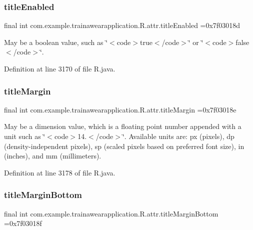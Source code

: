 \subsubsection{\texorpdfstring{titleEnabled}{titleEnabled}}
{\footnotesize\ttfamily final int com.\+example.\+trainawearapplication.\+R.\+attr.\+title\+Enabled =0x7f03018d\hspace{0.3cm}{\ttfamily [static]}}

May be a boolean value, such as \char`\"{}$<$code$>$true$<$/code$>$\char`\"{} or \char`\"{}$<$code$>$false$<$/code$>$\char`\"{}. 

Definition at line 3170 of file R.\+java.

\mbox{\label{classcom_1_1example_1_1trainawearapplication_1_1_r_1_1attr_a8bf14640d51c5af9fe22db8ed09e9d6b}} 
\subsubsection{\texorpdfstring{titleMargin}{titleMargin}}
{\footnotesize\ttfamily final int com.\+example.\+trainawearapplication.\+R.\+attr.\+title\+Margin =0x7f03018e\hspace{0.3cm}{\ttfamily [static]}}

May be a dimension value, which is a floating point number appended with a unit such as \char`\"{}$<$code$>$14.\+5sp$<$/code$>$\char`\"{}. Available units are\+: px (pixels), dp (density-\/independent pixels), sp (scaled pixels based on preferred font size), in (inches), and mm (millimeters). 

Definition at line 3178 of file R.\+java.

\mbox{\label{classcom_1_1example_1_1trainawearapplication_1_1_r_1_1attr_a973e482fdf6d971c3c6d041f403ea72d}} 
\subsubsection{\texorpdfstring{titleMarginBottom}{titleMarginBottom}}
{\footnotesize\ttfamily final int com.\+example.\+trainawearapplication.\+R.\+attr.\+title\+Margin\+Bottom =0x7f03018f\hspace{0.3cm}{\ttfamily [static]}}

